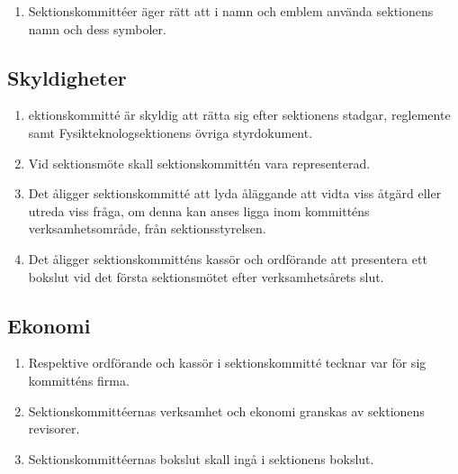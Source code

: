 \documentclass[11pt,a4paper]{article}
\begin{document}
\begin{enumerate}[\thesubsection .1]

  \item Sektionskommittéer äger rätt att i namn och emblem använda
  sektionens namn och dess symboler.

\end{enumerate}

\subsection{Skyldigheter}

\begin{enumerate}[\thesubsection .1]


    \item ektionskommitté är skyldig att rätta sig efter sektionens stadgar,  reglemente samt Fysikteknologsektionens övriga styrdokument.
  
  \item Vid sektionsmöte skall sektionskommittén vara representerad.

  \item Det åligger sektionskommitté att lyda åläggande att vidta viss
  åtgärd eller utreda viss fråga, om denna kan anses ligga inom
  kommitténs verksamhetsområde, från sektionsstyrelsen.

  \item Det åligger sektionskommitténs kassör och ordförande att
  presentera ett bokslut vid det första sektionsmötet efter verksamhetsårets slut.

\end{enumerate}

\subsection{Ekonomi}

\begin{enumerate}[\thesubsection .1]

  \item Respektive ordförande och kassör i sektionskommitté tecknar
  var för sig kommitténs firma.

  \item Sektionskommittéernas verksamhet och ekonomi granskas av
  sektionens revisorer.

  \item Sektionskommittéernas bokslut skall ingå i sektionens bokslut.

\end{enumerate}
\end{document}
